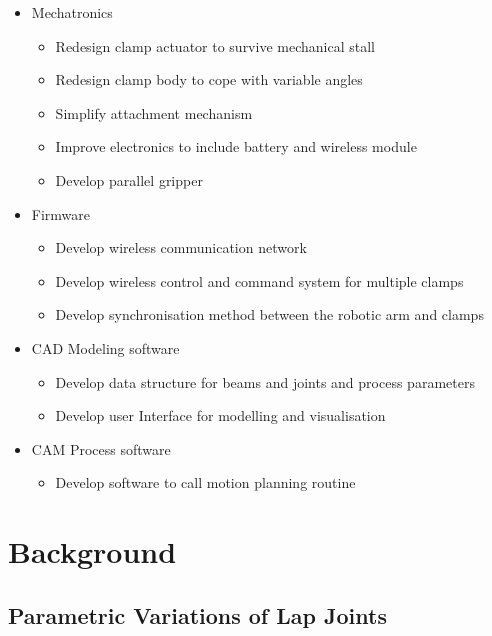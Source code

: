 \begin{itemize}[nosep]
    \item Mechatronics
    \begin{itemize}
        \item Redesign clamp actuator to survive mechanical stall
        \item Redesign clamp body to cope with variable angles
        \item Simplify attachment mechanism
        \item Improve electronics to include battery and wireless module
        \item Develop parallel gripper
    \end{itemize}
    \item Firmware
    \begin{itemize}
        \item Develop wireless communication network
        \item Develop wireless control and command system for multiple clamps
        \item Develop synchronisation method between the robotic arm and clamps
    \end{itemize}
    \item CAD Modeling software 
    \begin{itemize}
        \item Develop data structure for beams and joints and process parameters
        \item Develop user Interface for modelling and visualisation
    \end{itemize}
    \item CAM Process software
    \begin{itemize}
        \item Develop software to call motion planning routine
    \end{itemize}
\end{itemize}

\section{Background}
\label{section:exploration-2-background}

\subsection{Parametric Variations of Lap Joints}
\label{subsection:exploration-2-parametric-variations-of-lap-joints}

